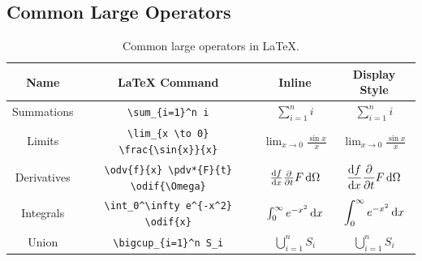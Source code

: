 \documentclass[11pt, twoside]{article}
\begin{document}
\subsection{Common Large Operators}
\begin{table}[H]
    \centering
    \begingroup
    \renewcommand{\arraystretch}{2.2}
    \begin{tabular}{c c c c}
        \toprule
        \textbf{Name} & \textbf{\LaTeX{} Command}                        & \textbf{Inline}                          & \textbf{Display Style}                                 \\
        \midrule
        Summations    & \lstinline|\sum_{i=1}^n i|                       & \(\sum_{i=1}^n i\)                       & \(\displaystyle \sum_{i=1}^n i\)                       \\
        Limits        & \lstinline|\lim_{x \to 0} \frac{\sin{x}}{x}|     & \(\lim_{x \to 0} \frac{\sin{x}}{x}\)     & \(\displaystyle \lim_{x \to 0} \frac{\sin{x}}{x}\)     \\
        Derivatives   & \lstinline|\odv{f}{x} \pdv*{F}{t} \odif{\Omega}| & \(\odv{f}{x} \pdv*{F}{t} \odif{\Omega}\) & \(\displaystyle \odv{f}{x} \pdv*{F}{t} \odif{\Omega}\) \\
        Integrals     & \lstinline|\int_0^\infty e^{-x^2} \odif{x}|      & \(\int_0^\infty e^{-x^2} \odif{x}\)      & \(\displaystyle \int_0^\infty e^{-x^2} \odif{x}\)      \\
        Union         & \lstinline|\bigcup_{i=1}^n S_i|                  & \(\bigcup_{i=1}^n S_i\)                  & \(\displaystyle \bigcup_{i=1}^n S_i\)                  \\
        \bottomrule
    \end{tabular}
    \endgroup
    \caption{Common large operators in \LaTeX{}.} %
\end{table}
\end{document}
